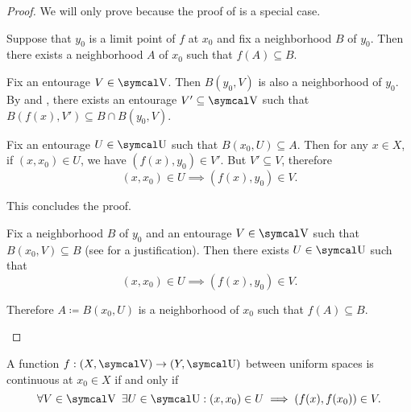 \begin{proof}
  We will only prove  because the proof of  is a special case.

  \begin{RefList}
    \ISufficiency Suppose that \( y_0 \) is a limit point of \( f \) at \( x_0 \) and fix a neighborhood \( B \) of \( y_0 \). Then there exists a neighborhood \( A \) of \( x_0 \) such that \( f(A) \subseteq B \).

    Fix an entourage \( V \in \CV \). Then \( B(y_0, V) \) is also a neighborhood of \( y_0 \). By  and , there exists an entourage \( V' \subseteq \CV \) such that \( B(f(x), V') \subseteq B \cap B(y_0, V) \).

    Fix an entourage \( U \in \CU \) such that \( B(x_0, U) \subseteq A \). Then for any \( x \in X \), if \( (x, x_0) \in U \), we have \( (f(x), y_0) \in V' \). But \( V' \subseteq V \), therefore
    \begin{equation*}
      (x, x_0) \in U \implies (f(x), y_0) \in V.
    \end{equation*}

    This concludes the proof.

    \INecessity Fix a neighborhood \( B \) of \( y_0 \) and an entourage \( V \in \CV \) such that \( B(x_0, V) \subseteq B \) (see  for a justification). Then there exists \( U \in \CU \) such that
    \begin{equation*}
      (x, x_0) \in U \implies (f(x), y_0) \in V.
    \end{equation*}

    Therefore \( A \coloneqq B(x_0, U) \) is a neighborhood of \( x_0 \) such that \( f(A) \subseteq B \).
  \end{RefList}
\end{proof}

\begin{Corollary}\label{thm:uniform_space_local_continuity}
  A function \( f: (X, \CV) \to (Y, \CU) \) between uniform spaces is continuous at \( x_0 \in X \) if and only if
  \begin{equation*}
    \forall V \in \CV \ \exists U \in \CU : (x, x_0) \in U \implies (f(x), f(x_0)) \in V.
  \end{equation*}
\end{Corollary}

